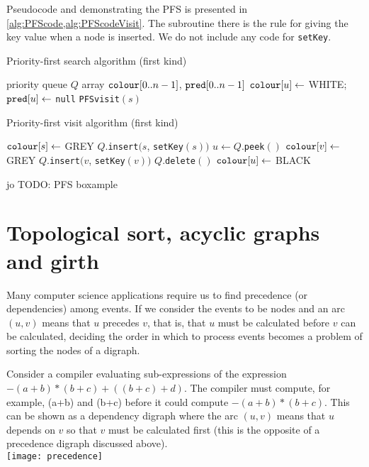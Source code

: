 Pseudocode  and  demonstrating the PFS is presented in \cref{alg:PFScode,alg:PFScodeVisit}. 
The subroutine  there is the rule for giving the key value when a node is inserted. 
We do not include any code for \texttt{setKey}.

\begin{algorithm}[H]
  \caption{Priority-first search algorithm (first kind)}
  \label{alg:PFScode}
\begin{algorithmic}[1]
	\State priority queue $Q$  
	\State array $\operatorname{\text{\texttt{colour}}}[0..n-1]$, $\operatorname{\text{\texttt{pred}}}[0..n-1]$
		\State $\operatorname{\text{\texttt{colour}}}[u] \gets $ WHITE; $\operatorname{\text{\texttt{pred}}}[u] \gets $ \texttt{null}
	\EndFor
			\State \texttt{PFSvisit}$(s)$
		\EndIf
	\EndFor
	\State \Return{$\pred$}
\EndFunction
\end{algorithmic}
\end{algorithm}

\begin{algorithm}[H]
  \caption{Priority-first visit algorithm (first kind)}
  \label{alg:PFScodeVisit}
  \begin{algorithmic}[1]
	\State $\operatorname{\text{\texttt{colour}}}[s] \gets $ GREY 
	\State $Q$.\texttt{insert}$(s$, \texttt{setKey}$(s))$
		\State $u \gets Q$.\texttt{peek}$()$
			\State $\operatorname{\text{\texttt{colour}}}[v] \gets $ GREY
			\State $Q$.\texttt{insert}$(v$, \texttt{setKey}$(v))$
		\Else
			\State $Q$.\texttt{delete}$()$
			\State $\operatorname{\text{\texttt{colour}}}[u] \gets$ BLACK
		\EndIf
	\EndWhile
\EndFunction
\end{algorithmic}
\end{algorithm}

jo TODO: PFS boxample

\chapter{Topological sort, acyclic graphs and girth} %
Many computer science applications require us to find precedence (or dependencies) among events. 
If we consider the events to be nodes and an arc $(u,v)$ means that $u$ precedes $v$, that is, 
that $u$ must be calculated before $v$ can be calculated, 
deciding the order in which to process events becomes a problem of sorting the nodes of a digraph.

\begin{Boxample}[0]
Consider a compiler evaluating sub-expressions of the expression $-(a+b) * (b+c) + ((b+c)+d)$.  
The compiler must compute, for example, (a+b) and (b+c) before it could compute $-(a+b) * (b+c)$. 
This can be shown as a dependency digraph where the arc $(u,v)$ means 
that $u$ depends on $v$ so that $v$ must be calculated first (this is the opposite of a precedence digraph discussed above).\\
\texttt{[image: precedence]}
\end{Boxample}


